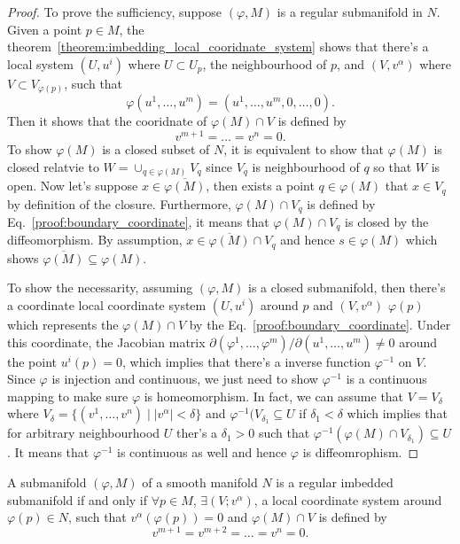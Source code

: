 \begin{proof}
To prove the sufficiency, suppose $(\varphi,M)$ is a regular submanifold in $N$. Given a point $p\in M$, the theorem~\ref{theorem:imbedding_local_cooridnate_system} shows that there's a local system $(U,u^i)$ where $U\subset U_p$, the neighbourhood of $p$, and $(V,v^\alpha)$ where $V\subset V_{\varphi(p)}$, such that
\begin{equation}
\varphi(u^1,\dots, u^m)=(u^1,\dots, u^m,0,\dots,0).
\end{equation}
Then it shows that the cooridnate of $\varphi(M)\cap V$ is defined by
\begin{equation}
v^{m+1}=\dots=v^n=0.
\end{equation}\label{proof:boundary_coordinate}
To show $\varphi(M)$ is a closed subset of $N$, it is equivalent to show that $\varphi(M)$ is closed relatvie to $W=\cup_{q\in \varphi(M)}V_{q}$ since $V_q$ is neighbourhood of $q$ so that $W$ is open. Now let's suppose $x\in \overline{\varphi(M)}$, then exists a point $q\in \varphi(M)$ that $x\in V_q$ by definition of the closure. Furthermore, $\varphi(M)\cap V_q$ is defined by Eq.~\ref{proof:boundary_coordinate}, it means that $\varphi(M)\cap V_q$ is closed by the diffeomorphism. By assumption, $x\in\overline{\varphi(M)}\cap V_q$ and hence $s\in \varphi(M)$ which shows $\overline{\varphi(M)}\subseteq \varphi(M)$. 

To show the necessarity, assuming $(\varphi, M)$ is a closed submanifold, then there's a coordinate local coordinate system $(U,u^i)$ around $p$ and $(V,v^\alpha)$ $\varphi(p)$ which represents the $\varphi(M)\cap V$ by the Eq.~\ref{proof:boundary_coordinate}. Under this coordinate, the Jacobian matrix $\partial(\varphi^1,\dots,\varphi^m)/\partial(u^1,\dots,u^m)\ne 0$ around the point $u^i(p)=0$, which implies that there's a inverse function $\varphi^{-1}$ on $V$. Since $\varphi$ is injection and continuous, we just need to show $\varphi^{-1}$ is a continuous mapping to make sure $\varphi$ is homeomorphism. In fact, we can assume that $V=V_{\delta}$ where $V_\delta=\{(v^1,\dots,v^n)\mid|v^\alpha|<\delta\}$ and $\varphi^{-1}(V_{\delta_1}\subseteq U$ if $\delta_1<\delta$ which implies that for arbitrary neighbourhood $U$ ther's a $\delta_1>0$ such that $\varphi^{-1}(\varphi(M)\cap V_{\delta_1})\subseteq U$. It means that $\varphi^{-1}$ is continuous as well and hence $\varphi$ is diffeomrophism.
\end{proof}

\begin{corollary}
A submanifold $(\varphi, M)$ of a smooth manifold $N$ is a regular imbedded submanifold if and only if $\forall p\in M$, $\exists(V;v^\alpha)$, a local coordinate system around $\varphi(p)\in N$, such that $v^\alpha(\varphi(p))=0$ and $\varphi(M)\cap V$ is defined by
\begin{equation}
v^{m+1}=v^{m+2}=\dots=v^n=0.
\end{equation}
\end{corollary}

